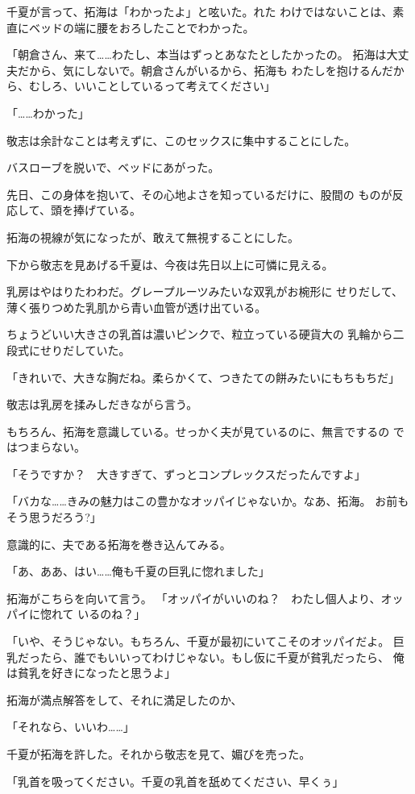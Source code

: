 ﻿\documentclass[
    book,tate,
    line_length=30zw,
    jafontsize=12pt,
    paper=b5j,
    landscape,
    ]{jlreq}
\begin{document}
千夏が言って、拓海は「わかったよ」と呟いた。れた
わけではないことは、素直にベッドの端に腰をおろしたことでわかった。

「朝倉さん、来て……わたし、本当はずっとあなたとしたかったの。
拓海は大丈夫だから、気にしないで。朝倉さんがいるから、拓海も
わたしを抱けるんだから、むしろ、いいことしているって考えてください」

「……わかった」

敬志は余計なことは考えずに、このセックスに集中することにした。

バスローブを脱いで、ベッドにあがった。

先日、この身体を抱いて、その心地よさを知っているだけに、股間の
ものが反応して、頭を捧げている。

拓海の視線が気になったが、敢えて無視することにした。

下から敬志を見あげる千夏は、今夜は先日以上に可憐に見える。

乳房はやはりたわわだ。グレープルーツみたいな双乳がお椀形に
せりだして、薄く張りつめた乳肌から青い血管が透け出ている。

ちょうどいい大きさの乳首は濃いピンクで、粒立っている硬貨大の
乳輪から二段式にせりだしていた。

「きれいで、大きな胸だね。柔らかくて、つきたての餅みたいにもちもちだ」

敬志は乳房を揉みしだきながら言う。

もちろん、拓海を意識している。せっかく夫が見ているのに、無言でするの
ではつまらない。

「そうですか？　大きすぎて、ずっとコンプレックスだったんですよ」

「バカな……きみの魅力はこの豊かなオッパイじゃないか。なあ、拓海。
お前もそう思うだろう?」

意識的に、夫である拓海を巻き込んてみる。

「あ、ああ、はい……俺も千夏の巨乳に惚れました」

拓海がこちらを向いて言う。
「オッパイがいいのね？　わたし個人より、オッパイに惚れて
いるのね？」

「いや、そうじゃない。もちろん、千夏が最初にいてこそのオッパイだよ。
巨乳だったら、誰でもいいってわけじゃない。もし仮に千夏が貧乳だったら、
俺は貧乳を好きになったと思うよ」

拓海が満点解答をして、それに満足したのか、

「それなら、いいわ……」

千夏が拓海を許した。それから敬志を見て、媚びを売った。

「乳首を吸ってください。千夏の乳首を舐めてください、早くぅ」
\end{document}
